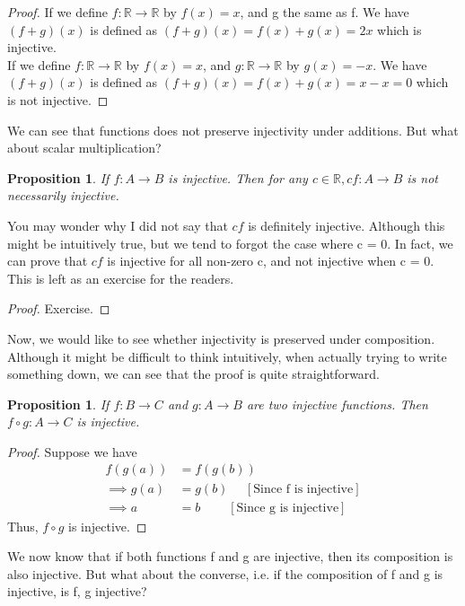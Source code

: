 \documentclass{book}
\newtheorem{proposition}[theorem]{Proposition}
\begin{document}
\begin{proof}
    If we define $f : \mathbb{R} \rightarrow \mathbb{R}$ by $f(x) = x$, and g the same as f. We have $(f + g)(x)$ is defined as $(f + g)(x) = f(x) + g(x) = 2x$ which is injective. \\
    If we define $f : \mathbb{R} \rightarrow \mathbb{R}$ by $f(x) = x$, and $g : \mathbb{R} \rightarrow \mathbb{R}$ by $g(x) = -x$. We have $(f + g)(x)$ is defined as $(f + g)(x) = f(x) + g(x) = x - x = 0$ which is not injective. 
\end{proof}
We can see that functions does not preserve injectivity under additions. But what about scalar multiplication?
\begin{proposition}
    If $f : A \rightarrow B$ is injective. Then for any $c \in \mathbb{R}, cf : A \rightarrow B$ is not necessarily injective.
\end{proposition}
You may wonder why I did not say that $cf$ is definitely injective. Although this might be intuitively true, but we tend to forgot the case where c = 0. In fact, we can prove that $cf$ is injective for all non-zero c, and not injective when c = 0. This is left as an exercise for the readers.
\begin{proof}
    Exercise. 
\end{proof}
Now, we would like to see whether injectivity is preserved under composition. Although it might be difficult to think intuitively, when actually trying to write something down, we can see that the proof is quite straightforward.
\begin{proposition}
    If $f : B \rightarrow C$ and $g : A \rightarrow B$ are two injective functions. Then $f \circ g : A \rightarrow C$ is injective.
\end{proposition}
\begin{proof}
    Suppose we have
    \begin{align*}
        f(g(a)) & = f(g(b)) \\
        \implies g(a) & = g(b) \ \ \ \ \ \ [\text{Since f is injective}]\\
        \implies a & = b \ \ \ \ \ \ \ \ \ \ [\text{Since g is injective}]
    \end{align*}
    Thus, $f \circ g$ is injective.
\end{proof}

We now know that if both functions f and g are injective, then its composition is also injective. But what about the converse, i.e. if the composition of f and g is injective, is f, g injective?
\end{document}
